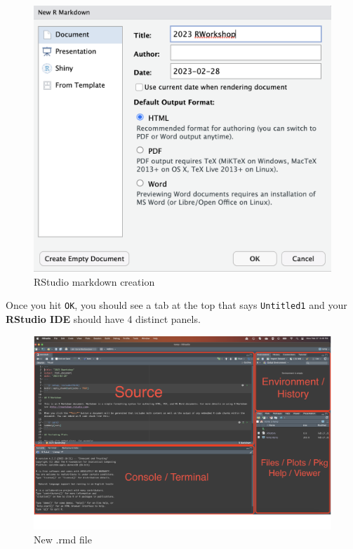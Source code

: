 \documentclass[
]{book}
\begin{document}
\begin{figure}
\includegraphics[width=16.14in]{images/2.4rmarkdown} \caption{RStudio markdown creation}\label{fig:unnamed-chunk-6}
\end{figure}

Once you hit \texttt{OK}, you should see a tab at the top that says \texttt{Untitled1} and your \textbf{RStudio IDE} should have 4 distinct panels.

\begin{figure}
\includegraphics[width=50in]{images/2.5newrmdfile} \caption{New .rmd file}\label{fig:unnamed-chunk-7}
\end{figure}
\end{document}
